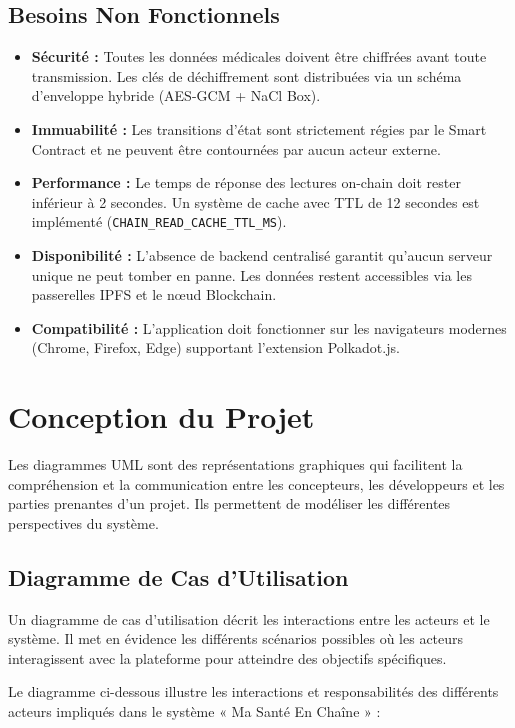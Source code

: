 \documentclass[12pt,a4paper]{report}
\begin{document}
\subsection{Besoins Non Fonctionnels}
\begin{itemize}
    \item \textbf{Sécurité :} Toutes les données médicales doivent être chiffrées avant toute transmission. Les clés de déchiffrement sont distribuées via un schéma d'enveloppe hybride (AES-GCM + NaCl Box).
    \item \textbf{Immuabilité :} Les transitions d'état sont strictement régies par le Smart Contract et ne peuvent être contournées par aucun acteur externe.
    \item \textbf{Performance :} Le temps de réponse des lectures on-chain doit rester inférieur à 2 secondes. Un système de cache avec TTL de 12 secondes est implémenté (\texttt{CHAIN\_READ\_CACHE\_TTL\_MS}).
    \item \textbf{Disponibilité :} L'absence de backend centralisé garantit qu'aucun serveur unique ne peut tomber en panne. Les données restent accessibles via les passerelles IPFS et le nœud Blockchain.
    \item \textbf{Compatibilité :} L'application doit fonctionner sur les navigateurs modernes (Chrome, Firefox, Edge) supportant l'extension Polkadot.js.
\end{itemize}

\section{Conception du Projet}
Les diagrammes UML sont des représentations graphiques qui facilitent la compréhension et la communication entre les concepteurs, les développeurs et les parties prenantes d'un projet. Ils permettent de modéliser les différentes perspectives du système.

\subsection{Diagramme de Cas d'Utilisation}
Un diagramme de cas d'utilisation décrit les interactions entre les acteurs et le système. Il met en évidence les différents scénarios possibles où les acteurs interagissent avec la plateforme pour atteindre des objectifs spécifiques.

Le diagramme ci-dessous illustre les interactions et responsabilités des différents acteurs impliqués dans le système « Ma Santé En Chaîne » :
\end{document}
